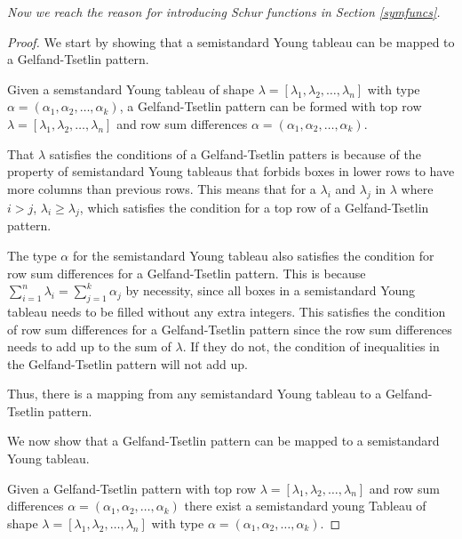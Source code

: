 		\bigskip
		
		\emph{Now we reach the reason for introducing Schur functions in Section \ref{symfuncs}. }
		\begin{proof}
			We start by showing that a semistandard Young tableau can be mapped to a Gelfand-Tsetlin pattern. 
			
			Given a semstandard Young tableau of shape $\lambda = [\lambda_1, \lambda_2, \dots, \lambda_n]$ with type $\alpha = (\alpha_1, \alpha_2, \dots, \alpha_k)$, a Gelfand-Tsetlin pattern can be formed with top row $\lambda = [\lambda_1, \lambda_2, \dots, \lambda_n]$ and row sum differences $\alpha = (\alpha_1, \alpha_2, \dots, \alpha_k)$. 
			
			That $\lambda$ satisfies the conditions of a Gelfand-Tsetlin patters is because of the property of semistandard Young tableaus that forbids boxes in lower rows to have more columns than previous rows. This means that for a $\lambda_i$ and $\lambda_j$ in $\lambda$ where $i > j$, $\lambda_i \geq \lambda_j$, which satisfies the condition for a top row of a Gelfand-Tsetlin pattern. 
			
			The type $\alpha$ for the semistandard Young tableau also satisfies the condition for row sum differences for a Gelfand-Tsetlin pattern. This is because $\sum_{i=1}^n \lambda_i = \sum_{j=1}^k \alpha_j$ by necessity, since all boxes in a semistandard Young tableau needs to be filled without any extra integers. This satisfies the condition of row sum differences for a Gelfand-Tsetlin pattern since the row sum differences needs to add up to the sum of $\lambda$. If they do not, the condition of inequalities in the Gelfand-Tsetlin pattern will not add up. 
			
			Thus, there is a mapping from any semistandard Young tableau to a Gelfand-Tsetlin pattern. 
			
			\bigskip
			
			We now show that a Gelfand-Tsetlin pattern can be mapped to a semistandard Young tableau. 
			
			Given a Gelfand-Tsetlin pattern with top row $\lambda = [\lambda_1, \lambda_2, \dots, \lambda_n]$ and row sum differences $\alpha = (\alpha_1, \alpha_2, \dots, \alpha_k)$ there exist a semistandard young Tableau of shape $\lambda = [\lambda_1, \lambda_2, \dots, \lambda_n]$ with type $\alpha = (\alpha_1, \alpha_2, \dots, \alpha_k)$. 
			

\end{proof}
